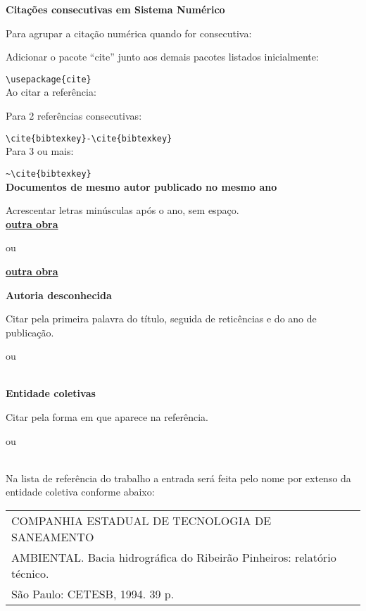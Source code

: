 \textbf{Citações consecutivas em Sistema Numérico}

Para agrupar a citação numérica quando for consecutiva:

Adicionar o pacote “cite” junto aos demais pacotes listados inicialmente:

\verb+\usepackage{cite}+ \\

Ao citar a referência:

Para 2 referências consecutivas: 

\verb+\cite{bibtexkey}-\cite{bibtexkey}+ \\

Para 3 ou mais: 

\verb+~\cite{bibtexkey}+ \\

\textbf{Documentos de mesmo autor publicado no mesmo ano}


Acrescentar letras minúsculas após o ano, sem espaço.\\

\cite{Hennekens1987b}  \textbf{\underline{outra obra}}   \cite{Hennekens1987a}

ou

  \textbf{\underline{outra obra}}   

\textbf{Autoria desconhecida}

Citar pela primeira palavra do título, seguida de reticências e do ano de publicação.\\

\cite{fgv1984}

ou 

\\

\textbf{Entidade coletivas}

Citar pela forma em que aparece na referência.\\

\cite{CETESB1994}

ou 

\\

Na lista de referência do trabalho a entrada será feita pelo nome por extenso da entidade coletiva conforme abaixo:\\

\begin{tabular}{|l|c|} \hline
	COMPANHIA ESTADUAL DE TECNOLOGIA DE SANEAMENTO \\AMBIENTAL.
	Bacia hidrográfica do Ribeirão Pinheiros: relatório técnico.\\ São Paulo: CETESB,
	1994. 39 p. \\\hline
\end{tabular}\\

